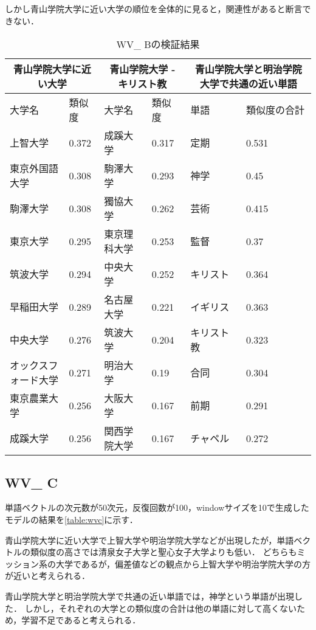 しかし青山学院大学に近い大学の順位を全体的に見ると，関連性があると断言できない．
\begin{table}[H]
\caption{WV\_ Bの検証結果}
\centering
\footnotesize
\begin{tabular}{ll|ll|ll}
\hline
\multicolumn{2}{c}{青山学院大学に近い大学} & \multicolumn{2}{c}{青山学院大学 - キリスト教} & \multicolumn{2}{c}{青山学院大学と明治学院大学で共通の近い単語}
\\ \hline
大学名 & 類似度 & 大学名 & 類似度 & 単語 & 類似度の合計
\\ \hline \hline
上智大学 & 0.372 & 成蹊大学 & 0.317 & 定期 & 0.531\\
東京外国語大学 & 0.308 & 駒澤大学 & 0.293 & 神学 & 0.45\\
駒澤大学 & 0.308 & 獨協大学 & 0.262 & 芸術 & 0.415\\
東京大学 & 0.295 & 東京理科大学 & 0.253 & 監督 & 0.37\\
筑波大学 & 0.294 & 中央大学 & 0.252 & キリスト & 0.364\\
早稲田大学 & 0.289 & 名古屋大学 & 0.221 & イギリス & 0.363\\
中央大学 & 0.276 & 筑波大学 & 0.204 & キリスト教 & 0.323\\
オックスフォード大学 & 0.271 & 明治大学 & 0.19 & 合同 & 0.304\\
東京農業大学 & 0.256 & 大阪大学 & 0.167 & 前期 & 0.291\\
成蹊大学 & 0.256 & 関西学院大学 & 0.167 & チャペル & 0.272\\ \hline
\end{tabular}
\label{table:wvb}
\end{table}


\subsection{WV\_ C}
単語ベクトルの次元数が50次元，反復回数が100，windowサイズを10で生成したモデルの結果を\ref{table:wvc}に示す．

青山学院大学に近い大学で上智大学や明治学院大学などが出現したが，単語ベクトルの類似度の高さでは清泉女子大学と聖心女子大学よりも低い．
どちらもミッション系の大学であるが，偏差値などの観点から上智大学や明治学院大学の方が近いと考えられる．

青山学院大学と明治学院大学で共通の近い単語では，神学という単語が出現した．
しかし，それぞれの大学との類似度の合計は他の単語に対して高くないため，学習不足であると考えられる．

